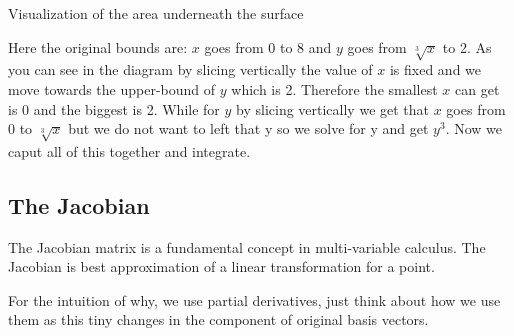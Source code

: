 \begin{center}

    Visualization of the area underneath the surface
    \smallskip

\end{center}

Here the original bounds are: \(x\) goes from 0 to 8 and \(y\) goes from \(\sqrt[3]{x}\) to 2.
As you can see in the diagram by slicing vertically the value of \(x\) is fixed and we move towards the upper-bound of \(y\) which is 2.
Therefore the smallest \(x\) can get is 0 and the biggest is 2. While for \(y\) by slicing vertically we get that \(x\) goes from 0
to \(\sqrt[3]{x}\) but we do not want to left that y so we solve for y and get \(y^3\). Now we caput all of this together and integrate.


\subsection{The Jacobian}

The Jacobian matrix is a fundamental concept in multi-variable calculus. The Jacobian is best
approximation of a linear transformation for a point.

For the intuition of why, we use partial derivatives, just think about
how we use them as this tiny changes in the component of original
basis vectors.

